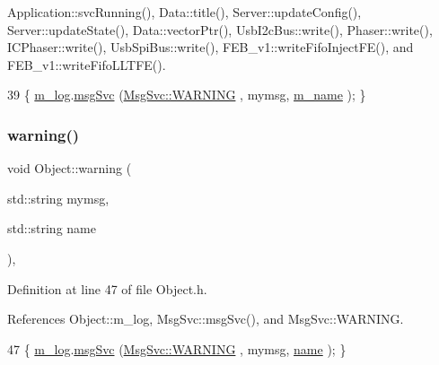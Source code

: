 Application\+::svc\+Running(), Data\+::title(), Server\+::update\+Config(), Server\+::update\+State(), Data\+::vector\+Ptr(), Usb\+I2c\+Bus\+::write(), Phaser\+::write(), I\+C\+Phaser\+::write(), Usb\+Spi\+Bus\+::write(), F\+E\+B\+\_\+v1\+::write\+Fifo\+Inject\+F\+E(), and F\+E\+B\+\_\+v1\+::write\+Fifo\+L\+L\+T\+F\+E().


\begin{DoxyCode}
39 \{ \hyperlink{classObject_a0d269813dd7ac1f24bc143031e2963f2}{m\_log}.\hyperlink{classMsgSvc_ad25f18047920cc59a314e5098259711c}{msgSvc} (\hyperlink{classMsgSvc_ae671eb7301996cd049d2da8a65925926a7cefae88f2ba26b2b05b676a383c834b}{MsgSvc::WARNING} , mymsg, \hyperlink{classObject_a8b83c95c705d2c3ba0d081fe1710f48d}{m\_name} ); \}
\end{DoxyCode}
\mbox{\label{classObject_a11f101db4dd73d9391b0231818881d86}} 
\subsubsection{\texorpdfstring{warning()}{warning()}\hspace{0.1cm}{\footnotesize\ttfamily [2/2]}}
{\footnotesize\ttfamily void Object\+::warning (\begin{DoxyParamCaption}\item[{std\+::string}]{mymsg,  }\item[{std\+::string}]{name }\end{DoxyParamCaption})\hspace{0.3cm}{\ttfamily [inline]}, {\ttfamily [inherited]}}



Definition at line 47 of file Object.\+h.



References Object\+::m\+\_\+log, Msg\+Svc\+::msg\+Svc(), and Msg\+Svc\+::\+W\+A\+R\+N\+I\+NG.


\begin{DoxyCode}
47 \{ \hyperlink{classObject_a0d269813dd7ac1f24bc143031e2963f2}{m\_log}.\hyperlink{classMsgSvc_ad25f18047920cc59a314e5098259711c}{msgSvc} (\hyperlink{classMsgSvc_ae671eb7301996cd049d2da8a65925926a7cefae88f2ba26b2b05b676a383c834b}{MsgSvc::WARNING} , mymsg, \hyperlink{classObject_a300f4c05dd468c7bb8b3c968868443c1}{name} ); \}
\end{DoxyCode}
\mbox{\label{classICECALv3_a9d7c33e6d113e7f721dc848d28ab44d8}} 
